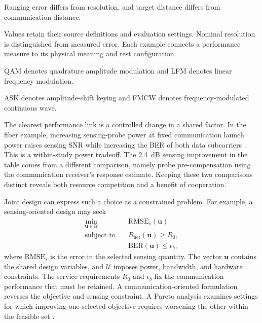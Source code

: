 \begin{table}[!t]
\begin{tabularx}{\textwidth}
Ranging error differs from resolution, and target distance differs
from communication distance. \\
\bottomrule
\end{tabularx}
\par\vspace{3pt}
\noindent\parbox{\textwidth}{\raggedright\footnotesize
Values retain their source definitions and evaluation settings. Nominal
resolution is distinguished from measured error. Each example connects a
performance measure to its physical meaning and test configuration.\par
QAM denotes quadrature amplitude modulation and LFM denotes linear frequency
modulation.\par
ASK denotes amplitude-shift keying and FMCW denotes frequency-modulated
continuous wave.\par}
\endgroup
\end{table}

The clearest performance link is a controlled change in a shared factor.
In the fiber example, increasing sensing-probe power at fixed communication
launch power raises sensing SNR while increasing the BER of both data
subcarriers \cite{OISAC_SCR00057}. This is a within-study power tradeoff.
The 2.4~dB sensing improvement in the table comes from a different comparison,
namely probe pre-compensation using the communication receiver's response
estimate. Keeping these two comparisons distinct reveals both resource
competition and a benefit of cooperation.

Joint design can express such a choice as a constrained problem. For example,
a sensing-oriented design may seek
\begin{equation}
\begin{aligned}
\min_{\boldsymbol{u}\in\mathcal{U}}\quad&
\mathrm{RMSE}_{s}(\boldsymbol{u})\\
\text{subject to}\quad&
R_{\mathrm{net}}(\boldsymbol{u})\geq R_0,\\
&\mathrm{BER}(\boldsymbol{u})\leq\epsilon_b ,
\end{aligned}
\label{eq:joint_design_service_floor}
\end{equation}
where $\mathrm{RMSE}_{s}$ is the error in the selected sensing quantity.
The vector $\boldsymbol{u}$ contains the shared design variables, and
$\mathcal{U}$ imposes power, bandwidth, and hardware constraints.
The service requirements $R_0$ and $\epsilon_b$ fix the communication
performance that must be retained. A communication-oriented formulation
reverses the objective and sensing constraint. A Pareto analysis examines
settings for which improving one selected objective requires worsening the
other within the feasible set
\cite{Wen2024OISACArchitectures,Lyu2026PhotonicTHzWaveforms}.

